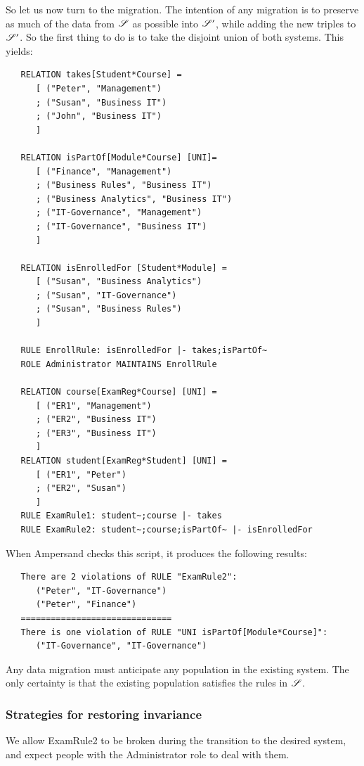 \documentclass{elsarticle}
\begin{document}
   So let us now turn to the migration.
   The intention of any migration is to preserve as much of the data from $\mathscr{S}$ as possible into $\mathscr{S}'$,
   while adding the new triples to $\mathscr{S}'$.
   So the first thing to do is to take the disjoint union of both systems.
   This yields:
\begin{verbatim}
   RELATION takes[Student*Course] =
      [ ("Peter", "Management")
      ; ("Susan", "Business IT")
      ; ("John", "Business IT")
      ]
   
   RELATION isPartOf[Module*Course] [UNI]=
      [ ("Finance", "Management")
      ; ("Business Rules", "Business IT")
      ; ("Business Analytics", "Business IT")
      ; ("IT-Governance", "Management")
      ; ("IT-Governance", "Business IT")
      ]
   
   RELATION isEnrolledFor [Student*Module] =
      [ ("Susan", "Business Analytics")
      ; ("Susan", "IT-Governance")
      ; ("Susan", "Business Rules")
      ]
   
   RULE EnrollRule: isEnrolledFor |- takes;isPartOf~
   ROLE Administrator MAINTAINS EnrollRule
   
   RELATION course[ExamReg*Course] [UNI] =
      [ ("ER1", "Management")
      ; ("ER2", "Business IT")
      ; ("ER3", "Business IT")
      ]
   RELATION student[ExamReg*Student] [UNI] =
      [ ("ER1", "Peter")
      ; ("ER2", "Susan")
      ]
   RULE ExamRule1: student~;course |- takes
   RULE ExamRule2: student~;course;isPartOf~ |- isEnrolledFor
\end{verbatim}
   When Ampersand checks this script, it produces the following results:
\begin{verbatim}
   There are 2 violations of RULE "ExamRule2":
      ("Peter", "IT-Governance")
      ("Peter", "Finance")
   ==============================
   There is one violation of RULE "UNI isPartOf[Module*Course]":
      ("IT-Governance", "IT-Governance")
\end{verbatim}
   Any data migration must anticipate any population in the existing system.
   The only certainty is that the existing population satisfies the rules in $\mathscr{S}$.

\subsubsection{Strategies for restoring invariance}

We allow ExamRule2 to be broken during the transition to the desired system, and expect people with the Administrator role to deal with them.
\end{document}
